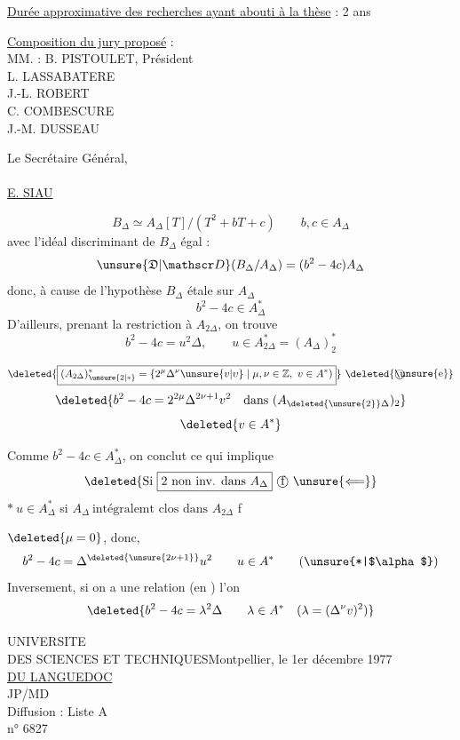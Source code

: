 \uline{Durée approximative des recherches ayant abouti à la thèse} : 2 ans

\uline{Composition du jury proposé} :\\
MM. : B. PISTOULET, Président\\
L. LASSABATERE\\
J.-L. ROBERT\\
C. COMBESCURE\\
J.-M. DUSSEAU

Le Secrétaire Général,\\
\\
\uline{E. SIAU}

\[
 B_\Delta\simeq A_\Delta[T]/(T^2+bT+c)\qquad b,c\in A_\Delta
\]
avec l'idéal discriminant de $B_\Delta$ égal :
\[
 \unsure{\mathfrak{D}|\mathscr D}(B_\Delta/A_\Delta)=(b^2-4c)A_\Delta
\]
donc, à cause de l'hypothèse $B_\Delta$ étale sur $A_\Delta$
\[
 b^2-4c\in A_\Delta^*
\]
D'ailleurs, prenant la restriction à $A_{2\Delta}$, on trouve
\[
 b^2-4c=u^2\Delta,\qquad u\in A_{2\Delta}^*=(A_\Delta)_2^*
\]

\[
 \deleted{\boxed{(A_{2\Delta})_{\unsure{2|*}}^*=\{2^\mu\Delta^\nu\unsure{v|\upsilon}\mid\mu,\nu\in\mathbb Z,\ v\in A^*)}}\ \deleted{\text{\textcircled{\unsure{e}}}}
\]
\[
 \deleted{b^2-4c=2^{2\mu}\Delta^{2\nu+1}v^2\quad\text{dans }(A_{\deleted{\unsure{2}}\Delta})_2}
\]
\[
 \deleted{v\in A^*}
\]

Comme $b^2-4c\in A_\Delta^*$, on conclut  ce qui implique
\[
 \deleted{\text{Si }\boxed{2\ \text{non inv. dans } A_\Delta}\ \text{\textcircled{f}}\ \unsure{\Longleftarrow}}
\]
$*\ u\in A_\Delta^*$ si $\boxed{A_\Delta\ \text{intégralemt clos dans } A_{2\Delta}}$ \textcircled{f}

$\deleted{\mu=0}$, donc,
\[
 b^2-4c=\Delta^{\deleted{\unsure{2\nu+1}}}u^2\qquad u\in A^* \tag*{(\unsure{*|$\alpha$})}
\]
Inversement, si on a une relation \unsure{$\alpha$|$(*)$} (en ) l'on 
\[
 \deleted{b^2-4c=\lambda^2\Delta\qquad\lambda\in A^*\quad(\lambda=(\Delta^\nu v)^{2})}
\]

UNIVERSITE\\
DES SCIENCES ET TECHNIQUES\hfill Montpellier, le 1er décembre 1977\\
\uline{DU LANGUEDOC}\\
JP/MD\\
Diffusion : Liste A\\
n° 6827

